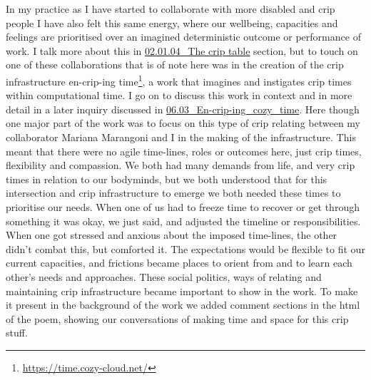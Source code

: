 In my practice as I have started to collaborate with more disabled and
crip people I have also felt this same energy, where our wellbeing,
capacities and feelings are prioritised over an imagined deterministic
outcome or performance of work. I talk more about this in
\href{../02_Crip-Tic\%20of\%20vignettes/02.01.04_The\%20crip\%20table.md}{02.01.04\_The
crip table} section, but to touch on one of these collaborations that is
of note here was in the creation of the crip infrastructure en-crip-ing
time\footnote{\url{https://time.cozy-cloud.net/}}, a work that imagines
and instigates crip times within computational time. I go on to discuss
this work in context and in more detail in a later inquiry discussed in
\href{../../06_A\%20Cozier\%20Configure-Ability/06.03_En-crip-ing_cozy_time.md}{06.03\_En-crip-ing\_cozy\_time}.
Here though one major part of the work was to focus on this type of crip
relating between my collaborator Mariana Marangoni and I in the making
of the infrastructure. This meant that there were no agile time-lines,
roles or outcomes here, just crip times, flexibility and compassion. We
both had many demands from life, and very crip times in relation to our
bodyminds, but we both understood that for this intersection and crip
infrastructure to emerge we both needed these times to prioritise our
needs. When one of us had to freeze time to recover or get through
something it was okay, we just said, and adjusted the timeline or
responsibilities. When one got stressed and anxious about the imposed
time-lines, the other didn't combat this, but comforted it. The
expectations would be flexible to fit our current capacities, and
frictions became places to orient from and to learn each other's needs
and approaches. These social politics, ways of relating and maintaining
crip infrastructure became important to show in the work. To make it
present in the background of the work we added comment sections in the
html of the poem, showing our conversations of making time and space for
this crip stuff.

